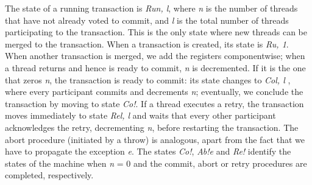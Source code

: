 The state of a running transaction is \emph{Ru\textlangle n, l\textrangle}, where \emph{n} is the number of threads that have not already voted to commit, and \emph{l} is the total number of threads participating to the transaction.
This is the only state where new threads can be merged to the transaction. When a transaction is created, its state is \emph{Ru, 1\textrangle}.
When another transaction is merged, we add the registers componentwise; when a thread returns and hence is ready to commit, \emph{n} is decremented.
If it is the one that zeros \emph{n}, the transaction is ready to commit: its state changes to \emph{Co\textlangle l, l\textrangle} , where every participant commits and decrements \emph{n}; eventually, we conclude the transaction by moving to state \emph{Co!\textlangle \textrangle}.
If a thread executes a retry, the transaction moves immediately to state \emph{Re\textlangle l, l\textrangle} and waits that every other participant acknowledges the retry, decrementing \emph{n}, before restarting the transaction.
The abort procedure (initiated by a throw) is analogous, apart from the fact that we have to propagate the exception \emph{e}.
The states \emph{Co!\textlangle \textrangle }, \emph{Ab!\textlangle e\textrangle}  and \emph{Re!\textlangle \textrangle}  identify the states of the machine when \emph{n} = 0 and the commit, abort or retry procedures are completed, respectively.

